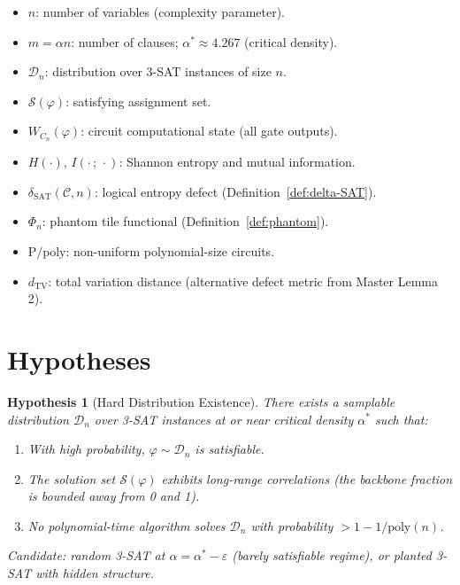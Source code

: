 \documentclass[11pt]{article}
\newtheorem{hypothesis}[lemma]{Hypothesis}
\theoremstyle{definition}
\begin{document}
\begin{itemize}
  \item $n$: number of variables (complexity parameter).
  \item $m = \alpha n$: number of clauses; $\alpha^* \approx 4.267$ (critical density).
  \item $\mathcal{D}_n$: distribution over 3-SAT instances of size $n$.
  \item $\mathcal{S}(\varphi)$: satisfying assignment set.
  \item $W_{C_n}(\varphi)$: circuit computational state (all gate outputs).
  \item $H(\cdot)$, $I(\cdot\,;\,\cdot)$: Shannon entropy and mutual information.
  \item $\delta_{\mathrm{SAT}}(\mathcal{C}, n)$: logical entropy defect (Definition~\ref{def:delta-SAT}).
  \item $\Phi_n$: phantom tile functional (Definition~\ref{def:phantom}).
  \item $\mathrm{P/poly}$: non-uniform polynomial-size circuits.
  \item $d_{\mathrm{TV}}$: total variation distance (alternative defect metric from Master Lemma 2).
\end{itemize}

\section{Hypotheses}

\begin{hypothesis}[Hard Distribution Existence]
\label{hyp:hard-dist}
There exists a samplable distribution $\mathcal{D}_n$ over 3-SAT instances at or near
critical density $\alpha^*$ such that:
\begin{enumerate}
  \item[(a)] With high probability, $\varphi \sim \mathcal{D}_n$ is satisfiable.
  \item[(b)] The solution set $\mathcal{S}(\varphi)$ exhibits long-range correlations
    (the backbone fraction is bounded away from 0 and 1).
  \item[(c)] No polynomial-time algorithm solves $\mathcal{D}_n$ with probability $> 1 - 1/\mathrm{poly}(n)$.
\end{enumerate}
Candidate: random 3-SAT at $\alpha = \alpha^* - \varepsilon$ (barely satisfiable regime),
or planted 3-SAT with hidden structure.
\end{hypothesis}
\end{document}
